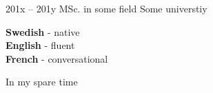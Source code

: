 \documentclass[9pt]{developercv} %
\begin{document}


\begin{entrylist}
	\entry
		{201x -- 201y}
		{MSc. in some field}
		{Some universtiy}
		{\lorem}
\end{entrylist}


\begin{minipage}[t]{0.3\textwidth} %
	\vspace{-\baselineskip} %

	\textbf{Swedish} - native\\
	\textbf{English} - fluent\\
	\textbf{French} - conversational\\
\end{minipage}
\hfill %
\begin{minipage}[t]{0.3\textwidth} %
	\vspace{-\baselineskip} %

	In my spare time \lorem
\end{minipage}
\hfill %
\begin{minipage}[t]{0.3\textwidth} %
	\vspace{-\baselineskip} %

	\lorem

\end{minipage}

\end{document}
